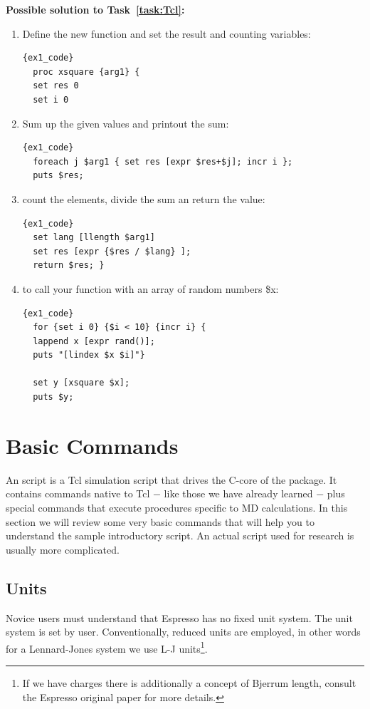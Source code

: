 \documentclass[
paper=a4,                       %
fontsize=11pt,                  %
twoside,                        %
footsepline,                    %
headsepline,                    %
headinclude=false,              %
footinclude=false,              %
pagesize,                       %
]{scrartcl}
\begin{document}
\textbf{Possible solution to Task~\ref{task:Tcl}:}
\begin{enumerate}
\item Define the new function and set the result and counting variables:
  {\small
  \begin{lstlisting}{ex1_code}
  proc xsquare {arg1} { 
  set res 0
  set i 0
  \end{lstlisting}
  }
\item Sum up the given values and printout the sum:
  {\small
  \begin{lstlisting}[firstnumber = auto]{ex1_code}
  foreach j $arg1 { set res [expr $res+$j]; incr i };
  puts $res;        
  \end{lstlisting}
  }
\item count the elements, divide the sum an return the value:
  {\small
  \begin{lstlisting}[firstnumber = auto]{ex1_code}
  set lang [llength $arg1]
  set res [expr {$res / $lang} ];
  return $res; }       
  \end{lstlisting}
  }
\item to call your function with an array of random numbers \$x:
 {\small
  \begin{lstlisting}[firstnumber = auto]{ex1_code}
  for {set i 0} {$i < 10} {incr i} {
  lappend x [expr rand()]; 
  puts "[lindex $x $i]"}

  set y [xsquare $x];
  puts $y; 
  \end{lstlisting}
  }
\end{enumerate} 

\section{\label{sec:ljliquid}Basic \es{} Commands}

An \es{} script is a Tcl simulation script that drives the C-core of the \es{} package. It contains commands native to Tcl $-$ like those we have already learned $-$ plus special \es{} commands that execute procedures specific to MD calculations. In this section we will review some very basic commands that will help you to understand the sample introductory script. An actual script used for research is usually more complicated.

\subsection{Units}

Novice users must understand that Espresso has no fixed unit system. The unit system is set by user. Conventionally, reduced units are employed, in other words for a Lennard-Jones system we use L-J units\footnote{If we have charges there is additionally a concept of Bjerrum length, consult the Espresso original paper for more details.}.
\end{document}
